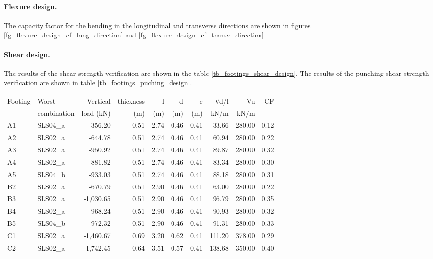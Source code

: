 \paragraph{Flexure design.}
The capacity factor for the bending in the longitudinal and transverse directions are shown in figures \ref{fg_flexure_design_cf_long_direction} and \ref{fg_flexure_design_cf_transv_direction}.

\paragraph{Shear design.}
The results of the shear strength verification are shown in the table \ref{tb_footings_shear_design}. The results of the punching shear strength verification are shown in table \ref{tb_footings_puching_design}.

\begin{table}
\begin{center}
  \begin{scriptsize}
\begin{tabular}{|l|l|r|r|r|r|r|r|r|r|}
\hline
Footing & Worst & Vertical & thickness & l & d & c & Vd/l & Vu & CF\\
 & combination & load (kN) & (m) & (m) & (m) & (m) & kN/m & kN/m & \\
\hline
 A1 &  SLS04\_a & -356.20 & 0.51 & 2.74 & 0.46 & 0.41 & 33.66 & 280.00 & 0.12\\
 A2 &  SLS02\_a & -644.78 & 0.51 & 2.74 & 0.46 & 0.41 & 60.94 & 280.00 & 0.22\\
 A3 &  SLS02\_a & -950.92 & 0.51 & 2.74 & 0.46 & 0.41 & 89.87 & 280.00 & 0.32\\
 A4 &  SLS02\_a & -881.82 & 0.51 & 2.74 & 0.46 & 0.41 & 83.34 & 280.00 & 0.30\\
 A5 &  SLS04\_b & -933.03 & 0.51 & 2.74 & 0.46 & 0.41 & 88.18 & 280.00 & 0.31\\
 B2 &  SLS02\_a & -670.79 & 0.51 & 2.90 & 0.46 & 0.41 & 63.00 & 280.00 & 0.22\\
 B3 &  SLS02\_a & -1,030.65 & 0.51 & 2.90 & 0.46 & 0.41 & 96.79 & 280.00 & 0.35\\
 B4 &  SLS02\_a & -968.24 & 0.51 & 2.90 & 0.46 & 0.41 & 90.93 & 280.00 & 0.32\\
 B5 &  SLS04\_b & -972.32 & 0.51 & 2.90 & 0.46 & 0.41 & 91.31 & 280.00 & 0.33\\
 C1 &  SLS02\_a & -1,460.67 & 0.69 & 3.20 & 0.62 & 0.41 & 111.20 & 378.00 & 0.29\\
 C2 &  SLS02\_a & -1,742.45 & 0.64 & 3.51 & 0.57 & 0.41 & 138.68 & 350.00 & 0.40\\

\end{tabular}
\end{scriptsize}
\end{center}
\end{table}
